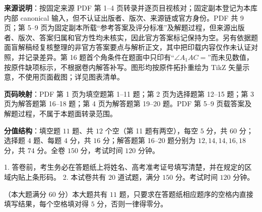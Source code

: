 

\begin{gktip}
\textbf{来源说明}：按固定来源 PDF 第 1–4 页转录并逐页目视核对；固定副本登记为本库内部 canonical 输入，但不认证出版者、版次、来源链或官方身份。PDF 共 9 页；第 5–9 页为固定副本所载“参考答案及评分标准”及解题过程，但来源出版者、版次、答案归属和官方性均未核实，因此官方答案标记保持为空。另有依据题面盲解稿经复核整理的非官方答案要点与解析正文，其中把印载内容仅作未认证对照，并记录差异。第 16 题首个角条件在题面中只印有“$\angle A_1AC =$”而未见数值，按原件缺项标示，不根据卷内解答补写。图形均按原件拓扑重绘为 TikZ 矢量示意，不使用页面截图；详见图表清单。

\textbf{页码映射}：PDF 第 1 页为填空题第 1–11 题；第 2 页为选择题第 12–15 题；第 3 页为解答题第 16–18 题；第 4 页为解答题第 19–20 题。PDF 第 5–9 页载答案及解题过程，不属于本题面转录范围。

\textbf{分值结构}：填空题 $11$ 题、共 $12$ 个空（第 11 题有两空），每空 $5$ 分，共 $60$ 分；选择题 $4$ 题、每题 $4$ 分，共 $16$ 分；解答题第 16–20 题分别为 $12,14,14,16,18$ 分，共 $74$ 分。全卷 $150$ 分，考试时间 $120$ 分钟。
\end{gktip}


1. 答卷前，考生务必在答题纸上将姓名、高考准考证号填写清楚，并在规定的区域内贴上条形码。
2. 本试卷共有 $20$ 道试题，满分 $150$ 分。考试时间 $120$ 分钟。


（本大题满分 $60$ 分）本大题共有 $11$ 题，只要求在答题纸相应题序的空格内直接填写结果，每个空格填对得 $5$ 分，否则一律得零分。

